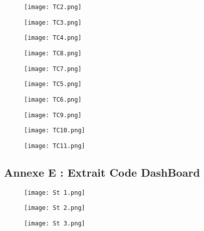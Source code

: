 \documentclass[a4paper,french,12pt]{article}
\begin{document}
\begin{figure}[!h]
    \centering
    \texttt{[image: TC2.png]}
\end{figure}

\begin{figure}[!h]
    \centering
    \texttt{[image: TC3.png]}
\end{figure}

\begin{figure}[!h]
    \centering
    \texttt{[image: TC4.png]}
\end{figure}

\begin{figure}[!h]
    \centering
    \texttt{[image: TC8.png]}
\end{figure}

\begin{figure}[!h]
    \centering
    \texttt{[image: TC7.png]}
\end{figure}

\begin{figure}[!h]
    \centering
    \texttt{[image: TC5.png]}
\end{figure}

\begin{figure}[!h]
    \centering
    \texttt{[image: TC6.png]}
\end{figure}

\begin{figure}[!h]
    \centering
    \texttt{[image: TC9.png]}
\end{figure}

\begin{figure}[!h]
    \centering
    \texttt{[image: TC10.png]}
\end{figure}

\begin{figure}[!h]
    \centering
    \texttt{[image: TC11.png]}
\end{figure}

\clearpage

\subsection{Annexe E : Extrait Code DashBoard}

\vspace{20mm}

\begin{figure}[!h]
    \centering
    \texttt{[image: St 1.png]}
\end{figure}

\begin{figure}[!h]
    \centering
    \texttt{[image: St 2.png]}
\end{figure}

\begin{figure}[!h]
    \centering
    \texttt{[image: St 3.png]}
\end{figure}
\end{document}
